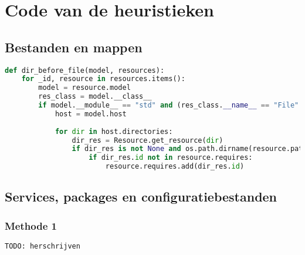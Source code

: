 \chapter{Code van de heuristieken}
\label{app:code}
\section{Bestanden en mappen}
\begin{minipage}{\textwidth}
\begin{lstlisting}[language=Python]
def dir_before_file(model, resources):
    for _id, resource in resources.items():
        model = resource.model
        res_class = model.__class__
        if model.__module__ == "std" and (res_class.__name__ == "File" or res_class.__name__ == "Directory"):
            host = model.host
 
            for dir in host.directories:
                dir_res = Resource.get_resource(dir)
                if dir_res is not None and os.path.dirname(resource.path) == dir_res.path:
                    if dir_res.id not in resource.requires:
                        resource.requires.add(dir_res.id)
\end{lstlisting}
\end{minipage}

\section{Services, packages en configuratiebestanden}
\subsection{Methode 1}
\begin{minipage}{\textwidth}
\begin{lstlisting}[language=Python]
TODO: herschrijven
\end{lstlisting}
\end{minipage}


